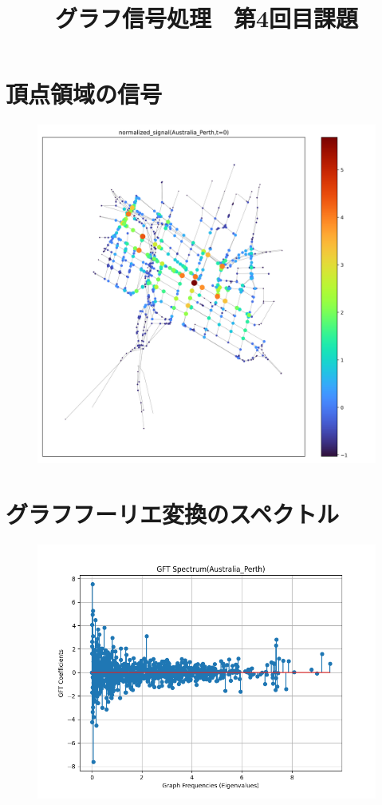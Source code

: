 \documentclass[dvipdfmx]{jsarticle}
\begin{document}
\title{グラフ信号処理　第4回目課題}
\date{}
\author{}
\maketitle

\section{頂点領域の信号}
\begin{figure}[h]
  \centering
  \includegraphics[width=\linewidth]{fig/normalized_signal_Australia_Perth.png}
\end{figure}

\section{グラフフーリエ変換のスペクトル}

\begin{figure}[h]
  \centering
  \includegraphics[width=\linewidth]{fig/gft_spectrum_Australia_Perth_test.png}
\end{figure}
\end{document}
